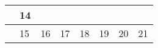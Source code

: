 {\begin{tabularx}{\linewidth}{|l!{\vrule width \myLenLineThicknessThick}*{7}{@{}X@{}|}}
       & 
    
      
      
        \begin{minipage}[t]{6mm}\centering{}14\end{minipage}
      
      
        \\  \hline 
      
    
  
  
  
  \hyperlink{week-2027-46}{} &
    
      
      
        \begin{minipage}[t]{6mm}\centering{}15\end{minipage}
      
       & 
    
      
      
        \begin{minipage}[t]{6mm}\centering{}16\end{minipage}
      
       & 
    
      
      
        \begin{minipage}[t]{6mm}\centering{}17\end{minipage}
      
       & 
    
      
      
        \begin{minipage}[t]{6mm}\centering{}18\end{minipage}
      
       & 
    
      
      
        \begin{minipage}[t]{6mm}\centering{}19\end{minipage}
      
       & 
    
      
      
        \begin{minipage}[t]{6mm}\centering{}20\end{minipage}
      
       & 
    
      
      
        \begin{minipage}[t]{6mm}\centering{}21\end{minipage}
      

\end{tabularx}}

